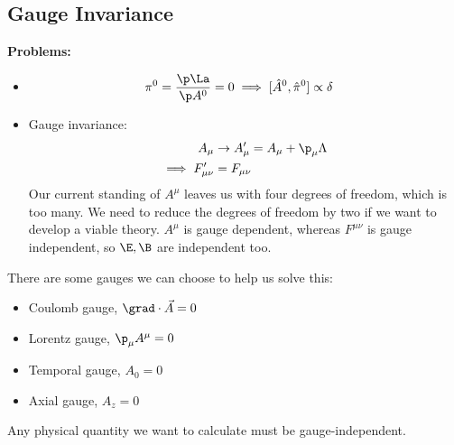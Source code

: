 \documentclass[a4paper, 11pt, normalem]{report}
\newcommand\hpi{\hat{\pi}}
\begin{document}
\section{Gauge Invariance}
\textbf{Problems:}
\begin{itemize}
    \item 
        \begin{align}
            \pi^0 &= \frac{\p\La}{\p A^0} = 0 \implies [\hat{A}^0,\hpi^0] \propto \delta
        \end{align}
    \item Gauge invariance:
        \begin{align}
            A_\mu &\to A_\mu' = A_\mu + \p_\mu\Lambda \\
            \implies F_{\mu\nu}' &= F_{\mu\nu}
        \end{align}
        Our current standing of $A^\mu$ leaves us with four degrees of freedom, which is too many. 
        We need to reduce the degrees of freedom by two if we want to develop a viable theory.
        $A^\mu$ is gauge dependent, whereas $F^{\mu\nu}$ is gauge independent, so $\E,\B$ are independent too.
\end{itemize}
There are some gauges we can choose to help us solve this:
\begin{itemize}
    \item Coulomb gauge, $\grad\cdot\vec{A} = 0$
    \item Lorentz gauge, $\p_\mu A^\mu = 0$
    \item Temporal gauge, $A_0 = 0$
    \item Axial gauge, $A_z = 0$
\end{itemize}
Any physical quantity we want to calculate must be gauge-independent.

\chapter{}
\end{document}
